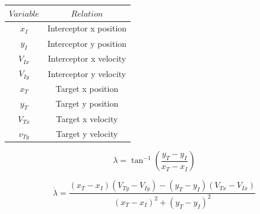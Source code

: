 \documentclass[conference]{IEEEtran}
\providecommand{\DIFdelbegin}{} %
\providecommand{\DIFdelend}{} %
\newcommand{\DIFscaledelfig}{0.5}
\newlength{\DIFdelgraphicswidth} %
\newlength{\DIFdelgraphicsheight} %
\newcommand{\DIFdelincludegraphics}[2][]{%
\sbox{\DIFdelgraphicsbox}{\DIFOincludegraphics[#1]{#2}}%
\settoboxwidth{\DIFdelgraphicswidth}{\DIFdelgraphicsbox} %
\settoboxtotalheight{\DIFdelgraphicsheight}{\DIFdelgraphicsbox} %
\scalebox{\DIFscaledelfig}{%
\parbox[b]{\DIFdelgraphicswidth}{\usebox{\DIFdelgraphicsbox}\\[-\baselineskip] \rule{\DIFdelgraphicswidth}{0em}}\llap{\resizebox{\DIFdelgraphicswidth}{\DIFdelgraphicsheight}{%
\setlength{\unitlength}{\DIFdelgraphicswidth}%
\begin{picture}(1,1)%
\thicklines\linethickness{2pt} %
{\color[rgb]{1,0,0}\put(0,0){\framebox(1,1){}}}%
{\color[rgb]{1,0,0}\put(0,0){\line( 1,1){1}}}%
{\color[rgb]{1,0,0}\put(0,1){\line(1,-1){1}}}%
\end{picture}%
}\hspace*{3pt}}} %
} %
\DeclareRobustCommand{\DIFdelbegin}{\DIFOdelbegin \let\includegraphics\DIFdelincludegraphics} %
\DeclareRobustCommand{\DIFdelend}{\DIFOaddend \let\includegraphics\DIFOincludegraphics} %
\begin{document}
 \begin{table}
 \centering
 \begin{tabular}{cc}

 	$Variable$ & $Relation$ \\
 	\hline 
 	$x_I$  & Interceptor x position \\ 

 	$y_I$ & Interceptor y position \\ 

 	$V_{Ix}$ & Interceptor x velocity \\ 

 	$V_{Iy}$ & Interceptor y velocity \\ 

 	$x_T$ & Target x position \\ 

 	$y_T$ & Target y position \\ 

 	$V_{Tx}$ & Target x velocity \\ 

 	$v_{Ty}$ & Target y velocity \\ 

 \end{tabular}
 \end{table}







\DIFdelbegin %

\DIFdelend \begin{equation} \label{eq:LOS}
\lambda = \tan^{-1} \left(\frac{y_T - y_I}{x_T - x_I}\right)
\end{equation} 

\begin{equation} \label{eq:losrate}
\dot{\lambda} = \frac{(x_T - x_I)(V_{Ty}-V_{Iy}) - (y_T - y_I)(V_{Tx}-V_{Ix})}{(x_T - x_I)^2+(y_T - y_I)^2}
\end{equation}




\DIFdelbegin %
\end{document}
